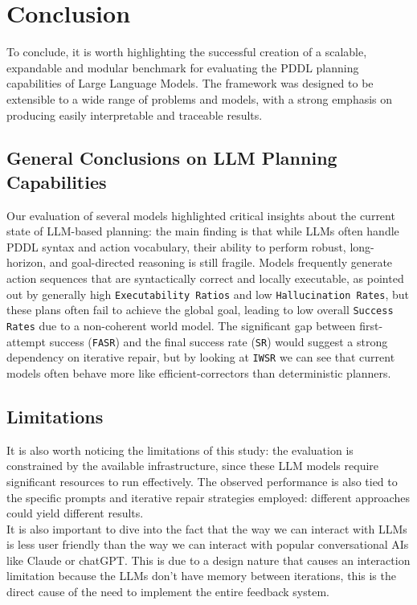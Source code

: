 \section{Conclusion}
To conclude, it is worth highlighting the successful creation of a scalable, expandable and modular benchmark for evaluating the PDDL planning capabilities of Large Language Models. The framework was designed to be extensible to a wide range of problems and models, with a strong emphasis on producing easily interpretable and traceable results.

\subsection{General Conclusions on LLM Planning Capabilities}
Our evaluation of several models highlighted critical insights about the current state of LLM-based planning: the main finding is that while LLMs often handle PDDL syntax and action vocabulary, their ability to perform robust, long-horizon, and goal-directed reasoning is still fragile.
Models frequently generate action sequences that are syntactically correct and locally executable, as pointed out by generally high \texttt{Executability Ratios} and low \texttt{Hallucination Rates}, but these plans often fail to achieve the global goal, leading to low overall \texttt{Success Rates} due to a non-coherent world model. The significant gap between first-attempt success (\texttt{FASR}) and the final success rate (\texttt{SR}) would suggest a strong dependency on iterative repair, but by looking at \texttt{IWSR} we can see that current models often behave more like efficient-correctors than deterministic planners.

\subsection{Limitations}
It is also worth noticing the limitations of this study: the evaluation is constrained by the available infrastructure, since these LLM models require significant resources to run effectively.
The observed performance is also tied to the specific prompts and iterative repair strategies employed: different approaches could yield different results.\\
It is also important to dive into the fact that the way we can interact with LLMs is less user friendly than the way we can interact with popular conversational AIs like Claude or chatGPT. This is due to a design nature that causes an interaction limitation because the LLMs don't have memory between iterations, this is the direct cause of the need to implement the entire feedback system.

